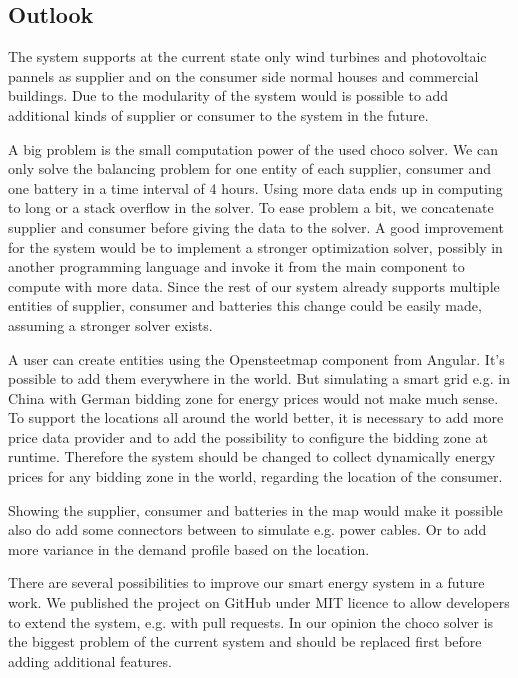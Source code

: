 \subsection{Outlook}
The system supports at the current state only wind turbines and photovoltaic pannels as supplier and on the consumer side normal houses and commercial buildings.
Due to the modularity of the system would is possible to add additional kinds of supplier or consumer to the system in the future.

A big problem is the small computation power of the used choco solver.
We can only solve the balancing problem for one entity of each supplier, consumer and one battery in a time interval of 4 hours.
Using more data ends up in computing to long or a stack overflow in the solver.
To ease problem a bit, we concatenate supplier and consumer before giving the data to the solver.
A good improvement for the system would be to implement a stronger optimization solver, possibly in another programming language and invoke it from the main component to compute with more data.
Since the rest of our system already supports multiple entities of supplier, consumer and batteries this change could be easily made, assuming a stronger solver exists.

A user can create entities using the Opensteetmap component from Angular.
It's possible to add them everywhere in the world.
But simulating a smart grid e.g. in China with German bidding zone for energy prices would not make much sense.
To support the locations all around the world better, it is necessary to add more price data provider and to add the possibility to configure the bidding zone at runtime.
Therefore the system should be changed to collect dynamically energy prices for any bidding zone in the world, regarding the location of the consumer.

Showing the supplier, consumer and batteries in the map would make it possible also do add some connectors between to simulate e.g. power cables. Or to add more variance in the demand profile based on the location.

There are several possibilities to improve our smart energy system in a future work.
We published the project on GitHub under MIT licence to allow developers to extend the system, e.g. with pull requests.
In our opinion the choco solver is the biggest problem of the current system and should be replaced first before adding additional features.